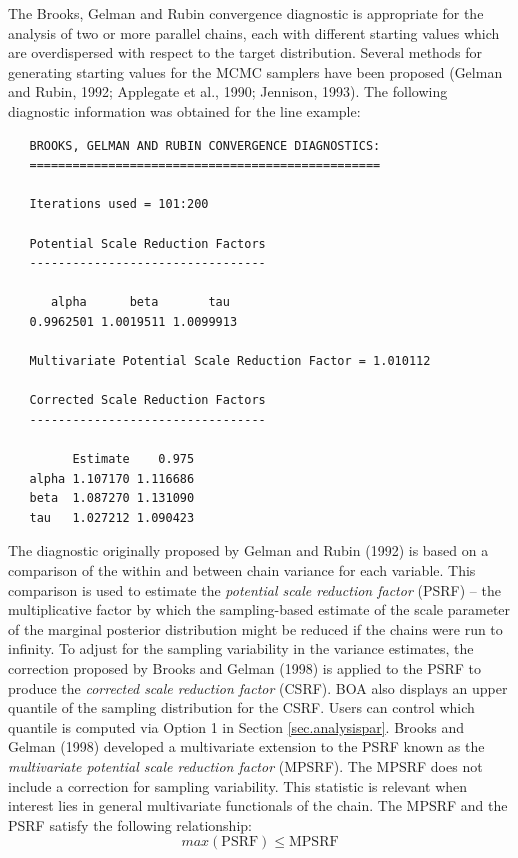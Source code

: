 \documentclass[12pt,letterpaper]{report}
\begin{document}
The Brooks, Gelman and Rubin convergence diagnostic is appropriate for the
analysis of two or more parallel chains, each with different starting values
which are overdispersed with respect to the target distribution. Several methods
for generating starting values for the MCMC samplers have been proposed (Gelman
and Rubin, 1992; Applegate et al., 1990; Jennison, 1993). The following
diagnostic information was obtained for the line example:
\vskip 9pt
\begin{tiny}
\begin{verbatim}
   BROOKS, GELMAN AND RUBIN CONVERGENCE DIAGNOSTICS:
   =================================================

   Iterations used = 101:200

   Potential Scale Reduction Factors
   ---------------------------------

      alpha      beta       tau
   0.9962501 1.0019511 1.0099913

   Multivariate Potential Scale Reduction Factor = 1.010112

   Corrected Scale Reduction Factors
   ---------------------------------

         Estimate    0.975
   alpha 1.107170 1.116686
   beta  1.087270 1.131090
   tau   1.027212 1.090423
\end{verbatim}
\end{tiny}
The diagnostic originally proposed by Gelman and Rubin (1992) is based on a
comparison of the within and between chain variance for each variable. This
comparison is used to estimate the {\it potential scale reduction factor} (PSRF)
-- the multiplicative factor by which the sampling-based estimate of the scale
parameter of the marginal posterior distribution might be reduced if the chains
were run to infinity. To adjust for the sampling variability in the variance
estimates, the correction proposed by Brooks and Gelman (1998) is applied to the
PSRF to produce the {\it corrected scale reduction factor} (CSRF). BOA also
displays an upper quantile of the sampling distribution for the CSRF. Users can
control which quantile is computed via Option 1 in Section
\ref{sec.analysispar}. Brooks and Gelman (1998) developed a multivariate
extension to the PSRF known as the {\it multivariate potential scale reduction
factor} (MPSRF). The MPSRF does not include a correction for sampling
variability. This statistic is relevant when interest lies in general
multivariate functionals of the chain. The MPSRF and the PSRF satisfy the
following relationship:
\begin{displaymath}
   max(\mbox{PSRF}) \le \mbox{MPSRF}
\end{displaymath}
\end{document}
